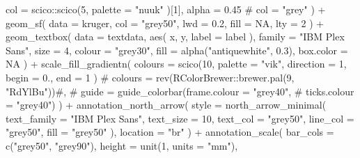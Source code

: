 \documentclass[]{article}
\newenvironment{Shaded}{}{}
\newcommand{\CommentTok}[1]{\textcolor[rgb]{0.00,0.50,0.00}{#1}}
\newcommand{\DataTypeTok}[1]{#1}
\newcommand{\DecValTok}[1]{#1}
\newcommand{\FloatTok}[1]{#1}
\newcommand{\KeywordTok}[1]{\textcolor[rgb]{0.00,0.00,1.00}{#1}}
\newcommand{\NormalTok}[1]{#1}
\newcommand{\OperatorTok}[1]{#1}
\newcommand{\OtherTok}[1]{\textcolor[rgb]{1.00,0.25,0.00}{#1}}
\newcommand{\StringTok}[1]{\textcolor[rgb]{0.00,0.50,0.50}{#1}}
\begin{document}
\begin{Shaded}
\begin{Highlighting}[]
    \DataTypeTok{col =}\NormalTok{ scico}\OperatorTok{::}\KeywordTok{scico}\NormalTok{(}\DecValTok{5}\NormalTok{,}
      \DataTypeTok{palette =} \StringTok{"nuuk"}
\NormalTok{    )[}\DecValTok{1}\NormalTok{],}
    \DataTypeTok{alpha =} \FloatTok{0.45}
    \CommentTok{# col = "grey"}
\NormalTok{  ) }\OperatorTok{+}
\StringTok{  }\KeywordTok{geom_sf}\NormalTok{(}
    \DataTypeTok{data =}\NormalTok{ kruger,}
    \DataTypeTok{col =} \StringTok{"grey50"}\NormalTok{,}
    \DataTypeTok{lwd =} \FloatTok{0.2}\NormalTok{,}
    \DataTypeTok{fill =} \OtherTok{NA}\NormalTok{,}
    \DataTypeTok{lty =} \DecValTok{2}
\NormalTok{  ) }\OperatorTok{+}
\StringTok{  }\KeywordTok{geom_textbox}\NormalTok{(}
    \DataTypeTok{data =}\NormalTok{ textdata,}
    \KeywordTok{aes}\NormalTok{(}
\NormalTok{      x, y,}
      \DataTypeTok{label =}\NormalTok{ label}
\NormalTok{    ),}
    \DataTypeTok{family =} \StringTok{"IBM Plex Sans"}\NormalTok{,}
    \DataTypeTok{size =} \DecValTok{4}\NormalTok{,}
    \DataTypeTok{colour =} \StringTok{"grey30"}\NormalTok{,}
    \DataTypeTok{fill =} \KeywordTok{alpha}\NormalTok{(}\StringTok{"antiquewhite"}\NormalTok{, }\FloatTok{0.3}\NormalTok{),}
    \DataTypeTok{box.color =} \OtherTok{NA}
\NormalTok{  ) }\OperatorTok{+}
\StringTok{  }\KeywordTok{scale_fill_gradientn}\NormalTok{(}
    \DataTypeTok{colours =} \KeywordTok{scico}\NormalTok{(}\DecValTok{10}\NormalTok{,}
      \DataTypeTok{palette =} \StringTok{"vik"}\NormalTok{,}
      \DataTypeTok{direction =} \DecValTok{1}\NormalTok{,}
      \DataTypeTok{begin =} \FloatTok{0.}\NormalTok{, }\DataTypeTok{end =} \DecValTok{1}
\NormalTok{    )}
    \CommentTok{# colours = rev(RColorBrewer::brewer.pal(9, "RdYlBu"))#,}
    \CommentTok{# guide = guide_colorbar(frame.colour = "grey40",}
    \CommentTok{#                        ticks.colour = "grey40")}
\NormalTok{  ) }\OperatorTok{+}
\StringTok{  }\KeywordTok{annotation_north_arrow}\NormalTok{(}
    \DataTypeTok{style =} \KeywordTok{north_arrow_minimal}\NormalTok{(}
      \DataTypeTok{text_family =} \StringTok{"IBM Plex Sans"}\NormalTok{,}
      \DataTypeTok{text_size =} \DecValTok{10}\NormalTok{,}
      \DataTypeTok{text_col =} \StringTok{"grey50"}\NormalTok{,}
      \DataTypeTok{line_col =} \StringTok{"grey50"}\NormalTok{,}
      \DataTypeTok{fill =} \StringTok{"grey50"}
\NormalTok{    ),}
    \DataTypeTok{location =} \StringTok{"br"}
\NormalTok{  ) }\OperatorTok{+}
\StringTok{  }\KeywordTok{annotation_scale}\NormalTok{(}
    \DataTypeTok{bar_cols =} \KeywordTok{c}\NormalTok{(}\StringTok{"grey50"}\NormalTok{, }\StringTok{"grey90"}\NormalTok{),}
    \DataTypeTok{height =} \KeywordTok{unit}\NormalTok{(}\DecValTok{1}\NormalTok{, }\DataTypeTok{units =} \StringTok{"mm"}\NormalTok{),}

\end{Highlighting}
\end{Shaded}
\end{document}
